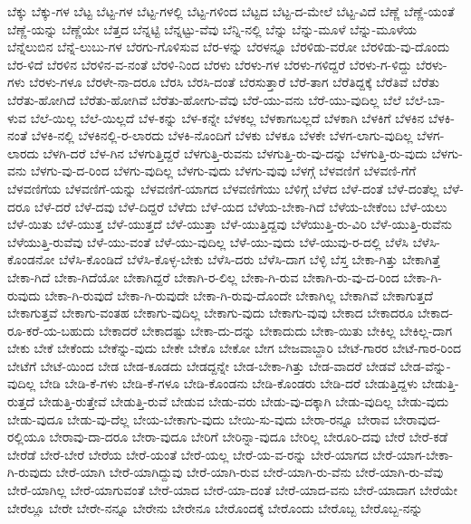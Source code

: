 {ಬೆಕ್ಕು
ಬೆಕ್ಕು-ಗಳ
ಬೆಟ್ಟ
ಬೆಟ್ಟ-ಗಳ
ಬೆಟ್ಟ-ಗಳಲ್ಲಿ
ಬೆಟ್ಟ-ಗಳಿಂದ
ಬೆಟ್ಟದ
ಬೆಟ್ಟ-ದ-ಮೇಲೆ
ಬೆಟ್ಟ-ವಿದೆ
ಬೆಣ್ಣೆ
ಬೆಣ್ಣೆ-ಯಂತೆ
ಬೆಣ್ಣೆ-ಯನ್ನು
ಬೆಣ್ಣೆಯೇ
ಬೆತ್ತದ
ಬೆನ್ನಟ್ಟಿ
ಬೆನ್ನಟ್ಟು-ವೆವು
ಬೆನ್ನಿ-ನಲ್ಲಿ
ಬೆನ್ನು
ಬೆನ್ನು-ಮೂಳೆ
ಬೆನ್ನು-ಮೂಳೆಯ
ಬೆನ್ನೆಲುಬಿನ
ಬೆನ್ನೆ-ಲುಬು-ಗಳ
ಬೆರಗು-ಗೊಳಿಸುವ
ಬೆರ-ಳನ್ನು
ಬೆರಳನ್ನೂ
ಬೆರಳಿಡು-ವರೋ
ಬೆರಳಿಡು-ವು-ದೊಂದು
ಬೆರ-ಳಿದೆ
ಬೆರಳಿನ
ಬೆರಳಿನ-ವ-ನಂತೆ
ಬೆರಳಿ-ನಿಂದ
ಬೆರಳು
ಬೆರಳು-ಗಳ
ಬೆರಳು-ಗಳಿದ್ದರೆ
ಬೆರಳು-ಗ-ಳಿದ್ದು
ಬೆರಳು-ಗಳು
ಬೆರಳು-ಗಳೂ
ಬೆರಳೇ-ನಾ-ದರೂ
ಬೆರಸಿ
ಬೆರಸಿ-ದಂತೆ
ಬೆರಸುತ್ತಾರೆ
ಬೆರೆ-ತಾಗ
ಬೆರೆತಿದ್ದಕ್ಕೆ
ಬೆರೆತಿವೆ
ಬೆರೆತು
ಬೆರೆತು-ಹೋಗಿದೆ
ಬೆರೆತು-ಹೋಗಿವೆ
ಬೆರೆತು-ಹೋಗು-ವೆವು
ಬೆರೆ-ಯು-ವನು
ಬೆರೆ-ಯು-ವುದಿಲ್ಲ
ಬೆಲೆ
ಬೆಲೆ-ಬಾ-ಳುವ
ಬೆಲೆ-ಯಿಲ್ಲ
ಬೆಲೆ-ಯಿಲ್ಲದೆ
ಬೆಳ-ಕನ್ನು
ಬೆಳ-ಕನ್ನೇ
ಬೆಳಕಲ್ಲ
ಬೆಳಕಾಗಬಲ್ಲದೆ
ಬೆಳಕಾಗಿ
ಬೆಳಕಿಗೆ
ಬೆಳಕಿನ
ಬೆಳಕಿ-ನಂತೆ
ಬೆಳಕಿ-ನಲ್ಲಿ
ಬೆಳಕಿನಲ್ಲಿ-ರ-ಲಾರದು
ಬೆಳಕಿ-ನೊಂದಿಗೆ
ಬೆಳಕು
ಬೆಳಕೂ
ಬೆಳಕೇ
ಬೆಳಗ-ಲಾಗು-ವುದಿಲ್ಲ
ಬೆಳಗ-ಲಾರದು
ಬೆಳಗಿ-ದರೆ
ಬೆಳ-ಗಿನ
ಬೆಳಗುತ್ತಿದ್ದರೆ
ಬೆಳಗುತ್ತಿ-ರುವನು
ಬೆಳಗುತ್ತಿ-ರು-ವು-ದನ್ನು
ಬೆಳಗುತ್ತಿ-ರು-ವುದು
ಬೆಳಗು-ವನು
ಬೆಳಗು-ವು-ದ-ರಿಂದ
ಬೆಳಗು-ವುದಿಲ್ಲ
ಬೆಳಗು-ವುದು
ಬೆಳಗು-ವುವು
ಬೆಳಗ್ಗೆ
ಬೆಳವಣಿಗೆ
ಬೆಳವಣಿ-ಗೆಗೆ
ಬೆಳವಣಿಗೆಯ
ಬೆಳವಣಿಗೆ-ಯನ್ನು
ಬೆಳವಣಿಗೆ-ಯಾಗದ
ಬೆಳವಣಿಗೆಯು
ಬೆಳಿಗ್ಗೆ
ಬೆಳೆದ
ಬೆಳೆ-ದಂತೆ
ಬೆಳೆ-ದಂತೆಲ್ಲ
ಬೆಳೆ-ದರೂ
ಬೆಳೆ-ದರೆ
ಬೆಳೆ-ದವು
ಬೆಳೆ-ದಿದ್ದರೆ
ಬೆಳೆದು
ಬೆಳೆ-ಯದ
ಬೆಳೆಯ-ಬೇಕಾ-ಗಿದೆ
ಬೆಳೆಯ-ಬೇಕೆಂಬ
ಬೆಳೆ-ಯಲು
ಬೆಳೆ-ಯಿತು
ಬೆಳೆ-ಯುತ್ತ
ಬೆಳೆ-ಯುತ್ತದೆ
ಬೆಳೆ-ಯುತ್ತಾ
ಬೆಳೆ-ಯುತ್ತಿದ್ದವು
ಬೆಳೆಯುತ್ತಿ-ರು-ವಿರಿ
ಬೆಳೆ-ಯುತ್ತಿ-ರುವೆನು
ಬೆಳೆಯುತ್ತಿ-ರುವೆವು
ಬೆಳೆ-ಯು-ವಂತೆ
ಬೆಳೆ-ಯು-ವುದಿಲ್ಲ
ಬೆಳೆ-ಯು-ವುದು
ಬೆಳೆ-ಯುವು-ರ-ದಲ್ಲಿ
ಬೆಳೆಸಿ
ಬೆಳೆಸಿ-ಕೊಂಡನೋ
ಬೆಳೆಸಿ-ಕೊಂಡಿದೆ
ಬೆಳೆಸಿ-ಕೊಳ್ಳ-ಬೇಕು
ಬೆಳೆಸಿ-ದರು
ಬೆಳೆಸಿ-ದಾಗ
ಬೆಳ್ಳಿ
ಬೆಸ್ತ
ಬೇಕಾ-ಗಿತ್ತು
ಬೇಕಾಗಿತ್ತೆ
ಬೇಕಾ-ಗಿದೆ
ಬೇಕಾ-ಗಿದೆಯೋ
ಬೇಕಾಗಿದ್ದರೆ
ಬೇಕಾಗಿ-ರ-ಲಿಲ್ಲ
ಬೇಕಾ-ಗಿ-ರುವ
ಬೇಕಾಗಿ-ರು-ವು-ದ-ರಿಂದ
ಬೇಕಾ-ಗಿ-ರುವುದು
ಬೇಕಾ-ಗಿ-ರುವುದೆ
ಬೇಕಾ-ಗಿ-ರುವುದೇ
ಬೇಕಾ-ಗಿ-ರುವು-ದೊಂದೇ
ಬೇಕಾಗಿಲ್ಲ
ಬೇಕಾಗಿವೆ
ಬೇಕಾಗುತ್ತದೆ
ಬೇಕಾಗುತ್ತವೆ
ಬೇಕಾಗು-ವಂತಹ
ಬೇಕಾಗು-ವುದಿಲ್ಲ
ಬೇಕಾಗು-ವುದು
ಬೇಕಾಗು-ವುವು
ಬೇಕಾದ
ಬೇಕಾದರೂ
ಬೇಕಾದ-ರೂ-ಕರೆ-ಯ-ಬಹುದು
ಬೇಕಾದರೆ
ಬೇಕಾದಷ್ಟು
ಬೇಕಾ-ದು-ದನ್ನು
ಬೇಕಾದುದು
ಬೇಕಾ-ಯಿತು
ಬೇಕಿಲ್ಲ
ಬೇಕಿಲ್ಲ-ದಾಗ
ಬೇಕು
ಬೇಕೆ
ಬೇಕೆಂದು
ಬೇಕೆನ್ನು-ವುದು
ಬೇಕೇ
ಬೇಕೊ
ಬೇಕೋ
ಬೇಗ
ಬೇಜವಾಬ್ದಾರಿ
ಬೇಟೆ-ಗಾರರ
ಬೇಟೆ-ಗಾರ-ರಿಂದ
ಬೇಟೆಗೆ
ಬೇಟೆ-ಯಿಂದ
ಬೇಡ
ಬೇಡ-ಕೂಡದು
ಬೇಡದ್ದನ್ನೇ
ಬೇಡ-ಬೇಕಾ-ಗಿತ್ತು
ಬೇಡ-ವಾದರೆ
ಬೇಡವೆ
ಬೇಡ-ವೆನ್ನು-ವುದಿಲ್ಲ
ಬೇಡಿ
ಬೇಡಿ-ಕೆ-ಗಳು
ಬೇಡಿ-ಕೆ-ಗಳೂ
ಬೇಡಿ-ಕೊಂಡನು
ಬೇಡಿ-ಕೊಂಡರು
ಬೇಡಿ-ದರೆ
ಬೇಡುತ್ತಿದ್ದಳು
ಬೇಡುತ್ತಿ-ರುತ್ತದೆ
ಬೇಡುತ್ತಿ-ರುತ್ತೇವೆ
ಬೇಡುತ್ತಿ-ರುವೆ
ಬೇಡುವ
ಬೇಡು-ವರು
ಬೇಡು-ವು-ದಕ್ಕಾಗಿ
ಬೇಡು-ವುದಿಲ್ಲ
ಬೇಡು-ವುದು
ಬೇಡು-ವುದೂ
ಬೇಡು-ವು-ದೆಲ್ಲ
ಬೇಯ-ಬೇಕಾಗು-ವುದು
ಬೇಯಿ-ಸು-ವುದು
ಬೇರಾ-ರನ್ನೂ
ಬೇರಾವ
ಬೇರಾವುದ-ರಲ್ಲಿಯೂ
ಬೇರಾವು-ದಾ-ದರೂ
ಬೇರಾ-ವುದೂ
ಬೇರಿಗೆ
ಬೇರಿನ್ನಾ-ವುದೂ
ಬೇರಿಲ್ಲ
ಬೇರೂರಿ-ದವು
ಬೇರೆ
ಬೇರೆ-ಕಡೆ
ಬೇರೆಡೆ
ಬೇರೆ-ಬೇರೆ
ಬೇರೆಯ
ಬೇರೆ-ಯಂತೆ
ಬೇರೆ-ಯಲ್ಲ
ಬೇರೆ-ಯ-ವ-ರನ್ನು
ಬೇರೆ-ಯಾಗದ
ಬೇರೆ-ಯಾಗ-ಬೇಕಾ-ಗಿ-ರುವುದು
ಬೇರೆ-ಯಾಗಿ
ಬೇರೆ-ಯಾಗಿದ್ದುವು
ಬೇರೆ-ಯಾಗಿ-ರುವ
ಬೇರೆ-ಯಾಗಿ-ರು-ವೆನು
ಬೇರೆ-ಯಾಗಿ-ರು-ವೆವು
ಬೇರೆ-ಯಾಗಿಲ್ಲ
ಬೇರೆ-ಯಾಗುವಂತೆ
ಬೇರೆ-ಯಾದ
ಬೇರೆ-ಯಾ-ದಂತೆ
ಬೇರೆ-ಯಾದ-ವನು
ಬೇರೆ-ಯಾದಾಗ
ಬೇರೆಯೇ
ಬೇರೆಲ್ಲೂ
ಬೇರೇ
ಬೇರೇ-ನನ್ನೂ
ಬೇರೇನು
ಬೇರೇನೂ
ಬೇರೊಂದಕ್ಕೆ
ಬೇರೊಂದು
ಬೇರೊಬ್ಬ
ಬೇರೊಬ್ಬ-ನನ್ನು
}
